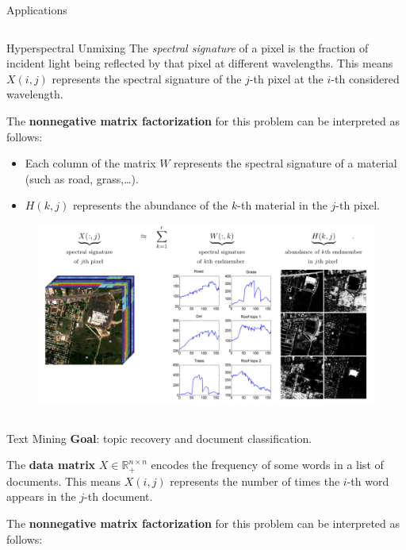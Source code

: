\documentclass[final]{beamer}
\newlength{\onecolwid}
\newlength{\threecolwid}
\newcommand{\real}{\mathbb{R}}
\begin{document}
\begin{frame}
\begin{columns}[t]
\begin{column}{\threecolwid}
\begin{exampleblock}{Applications}
\begin{columns}[t]
\begin{column}{\onecolwid}
\begin{block}{Hyperspectral Unmixing}
The \textit{spectral signature} of a pixel is the fraction of incident light being reflected by that pixel at different wavelengths.
This means \(X(i, j)\) represents the spectral signature of the $j$-th pixel at the $i$-th considered wavelength.

The \textbf{nonnegative matrix factorization} for this problem can be interpreted as follows:

\begin{itemize}
    \item Each column of the matrix $W$ represents the spectral signature of a material (such as road, grass,\dots).
    \item $H(k, j)$ represents the abundance of the $k$-th material in the $j$-th pixel.
\end{itemize}
\begin{figure}
    \centering
    \includegraphics[width=0.8\linewidth]{../images/NMF_app3.png}
\end{figure}
\end{block}
\end{column}
\end{columns}
\begin{block}{Text Mining}
\textbf{Goal}: topic recovery and document classification.

The \textbf{data matrix} $X\in\real^{n\times n}_+$ encodes the frequency of some words in a list of documents.
This means $X(i, j)$ represents the number of times the $i$-th word appears in the $j$-th document.

The \textbf{nonnegative matrix factorization} for this problem can be interpreted as follows:


\end{block}
\end{exampleblock}
\end{column}
\end{columns}
\end{frame}
\end{document}
